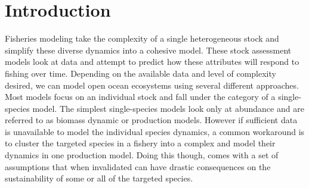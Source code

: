 \documentclass[oneside,12pt,final]{sty/ucthesis-CA2012}
\begin{document}
\begin{frontmatter}
	
	\maketitle
	\approvalpage
	\copyrightpage
	
	
	
	\tableofcontents
\end{frontmatter}


\begin{mainmatter}

\pagestyle{fancy}
\renewcommand{\chaptermark}[1]{\markboth{{\sf #1 \hspace*{\fill} Chapter~\thechapter}}{} }
\renewcommand{\sectionmark}[1]{\markright{ {\sf Section~\thesection \hspace*{\fill} #1 }}}
\fancyhf{}

\makeatletter \if@twoside \fancyhead[LO]{\small \rightmark} \fancyhead[RE]{\small\leftmark} \else \fancyhead[LO]{\small\leftmark}
\fancyhead[RE]{\small\rightmark} \fi

\def\cleardoublepage{\clearpage\if@openright \ifodd\c@page\else
  \hbox{}
  \vspace*{\fill}
  \begin{center}
    This page intentionally left blank
  \end{center}
  \vspace{\fill}
  \thispagestyle{plain}
  \newpage
  \fi \fi}
\makeatother
\fancyfoot[c]{\textrm{\textup{\thepage}}} %
\fancyfoot[C]{\thepage}
\renewcommand{\headrulewidth}{0.4pt}

 { \fancyhf{} \fancyfoot[C]{\thepage}
\renewcommand{\headrulewidth}{0pt}
\renewcommand{\footrulewidth}{0pt}}

\chapter{Introduction}
Fisheries modeling take the complexity of a single heterogeneous stock  and simplify these diverse dynamics into a cohesive model. These stock assessment models look at data and attempt to predict how these attributes will respond to fishing over time. Depending on the available data and level of complexity desired, we can model open ocean ecosystems using several different approaches. Most models focus on an individual stock and fall under the category of a single-species model. The simplest single-species models look only at abundance and are referred to as biomass dynamic or production models. However if sufficient data is unavailable to model the individual species dynamics, a common workaround is to cluster the targeted species in a fishery into a complex and model their dynamics in one production model. Doing this though, comes with a set of assumptions that when invalidated can have drastic consequences on the sustainability of some or all of the targeted species.


\end{mainmatter}
\end{document}
